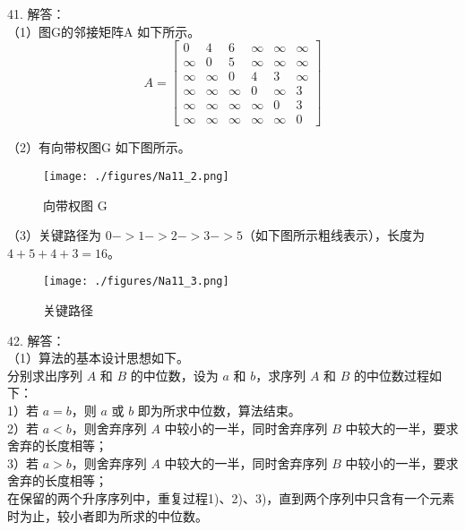 41. 解答： \\
（1）图G的邻接矩阵A 如下所示。 \\
\begin{equation}
A=
\begin{bmatrix}
 0 & 4 & 6 & \infty & \infty & \infty \\
 \infty & 0 & 5 & \infty & \infty & \infty \\
 \infty & \infty & 0 & 4 & 3 & \infty \\
 \infty & \infty & \infty & 0 & \infty & 3 \\
 \infty & \infty & \infty & \infty & 0 & 3 \\
 \infty & \infty & \infty & \infty & \infty & 0 
\end{bmatrix}
\end{equation}


（2）有向带权图G 如下图所示。 \\
\begin{figure}[ht]
\centering
\texttt{[image: ./figures/Na11\_2.png]}
\caption{向带权图 G} \label{Na11_fig2}
\end{figure}

（3）关键路径为 $0->1->2->3->5$（如下图所示粗线表示），长度为 $4+5+4+3=16$。 \\
\begin{figure}[ht]
\centering
\texttt{[image: ./figures/Na11\_3.png]}
\caption{关键路径} \label{Na11_fig3}
\end{figure}

42. 解答： \\
（1）算法的基本设计思想如下。 \\
分别求出序列 $A$ 和 $B$ 的中位数，设为 $a$ 和 $b$，求序列 $A$ 和 $B$ 的中位数过程如下： \\
1）若 $a=b$，则 $a$ 或 $b$ 即为所求中位数，算法结束。 \\
2）若 $a<b$，则舍弃序列 $A$ 中较小的一半，同时舍弃序列 $B$ 中较大的一半，要求舍弃的长度相等； \\
3）若 $a>b$，则舍弃序列 $A$ 中较大的一半，同时舍弃序列 $B$ 中较小的一半，要求舍弃的长度相等； \\
在保留的两个升序序列中，重复过程1)、2)、3)，直到两个序列中只含有一个元素时为止，较小者即为所求的中位数。

